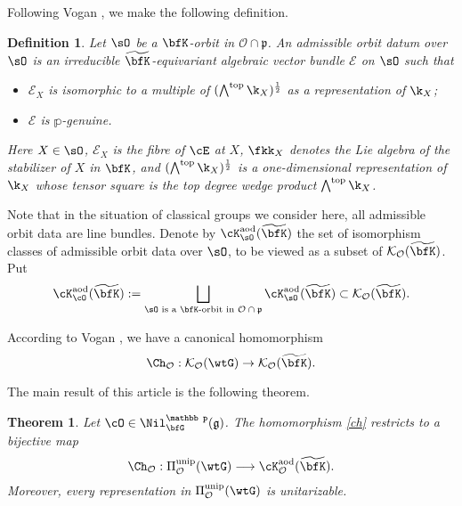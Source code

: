 \documentclass[12pt,a4paper]{amsart}
\newcommand{\CE}{{\mathcal {E}}}
\newcommand{\CK}{{\mathcal {K}}}
\newcommand{\CO}{{\mathcal {O}}}
\newcommand{\wt}{\widetilde}
\newcommand{\g}{\mathfrak g}
\newcommand{\p}{\mathfrak p}
\numberwithin{equation}{section}
\newtheorem{thml}[thm]{Theorem}
\newtheorem{defn}[thm]{Definition}
\theoremstyle{remark}
\def\wtbfK{\widetilde{\bfK}}
\def\cKaod{\cK^{\mathrm{aod}}}
\def\unip{\mathrm{unip}}
\begin{document}
Following Vogan \cite[Section 8]{Vo89}, we make the following definition.

\begin{defn}\label{defaod}
  Let $\sO$ be a $\bfK$-orbit in $\CO\cap \p$. An admissible orbit datum over
  $\sO$ is an irreducible $\wt{\bfK}$-equivariant algebraic vector bundle $\CE$
  on $\sO$ such that
  \begin{itemize}
    \item $\CE_X$ is isomorphic to a multiple of
    $(\bigwedge^{\mathrm{top}} \k_X )^{\frac{1}{2}}$ as a representation of
    $\k_X$;
    \item $\CE$ is $\mathbb p$-genuine.
  \end{itemize}
  Here $X\in \sO$, $\CE_X$ is the fibre of $\cE$ at $X$, $\fkk_X$
  denotes the Lie algebra of the stabilizer of $X$ in $\bfK$, and
  $(\bigwedge^{\mathrm{top}} \k_X)^{\frac{1}{2}}$ is a one-dimensional
  representation of $\k_X$ whose tensor square is the top degree wedge
  product $\bigwedge^{\mathrm{top}} \k_X$.
\end{defn}

Note that in the situation of classical groups we consider here, all admissible
orbit data are line bundles.  Denote by $\cKaod_{\sO}(\wtbfK)$ the
set of isomorphism classes of admissible orbit data over $\sO$, to be viewed as
a subset of $\CK_{\CO}(\wtbfK)$. Put
\[
  \cKaod_{\cO}(\wtbfK):=\bigsqcup_{\sO\textrm{ is a $\bfK$-orbit in
      $\CO\cap \p$}}  \cKaod_{\sO}(\wtbfK)\subset
  \CK_{\CO}(\wtbfK).
\]


According to Vogan \cite[Theorem 2.13]{Vo89}, we have a canonical homomorphism \begin{equation}\label{ch} \Ch_\CO:
\CK_{\CO}(\wtG)\rightarrow \CK_{\CO}(\wtbfK).  \end{equation}

The main result of this article is the following theorem.

\begin{thml}\label{main} Let $\cO \in   \Nil^{\mathbb p}_{\bfG}(\g)$.
  The homomorphism \eqref{ch} restricts to a bijective
  map
  \begin{equation}\label{bij}
    \Ch_\CO: \Pi^\unip_{\CO}(\wtG)\longrightarrow
    \cKaod_{\CO}(\wtbfK).
  \end{equation}
  Moreover, every representation in
  $\Pi^\unip_{\CO}(\wtG)$ is unitarizable.
\end{thml}
\end{document}
